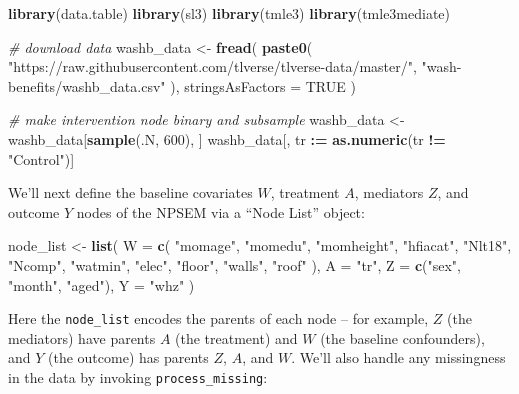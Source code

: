 \documentclass[12pt, krantz2,]{krantz}
\newenvironment{Shaded}{\begin{snugshade}}{\end{snugshade}}
\newcommand{\CommentTok}[1]{\textcolor[rgb]{0.37,0.37,0.37}{\textit{#1}}}
\newcommand{\DataTypeTok}[1]{\textcolor[rgb]{0.27,0.27,0.27}{#1}}
\newcommand{\DecValTok}[1]{\textcolor[rgb]{0.06,0.06,0.06}{#1}}
\newcommand{\ErrorTok}[1]{\textcolor[rgb]{0.14,0.14,0.14}{\textbf{#1}}}
\newcommand{\KeywordTok}[1]{\textcolor[rgb]{0.27,0.27,0.27}{\textbf{#1}}}
\newcommand{\NormalTok}[1]{#1}
\newcommand{\OperatorTok}[1]{\textcolor[rgb]{0.43,0.43,0.43}{\textbf{#1}}}
\newcommand{\OtherTok}[1]{\textcolor[rgb]{0.37,0.37,0.37}{#1}}
\newcommand{\StringTok}[1]{\textcolor[rgb]{0.5,0.5,0.5}{#1}}
\theoremstyle{definition}
\theoremstyle{definition}
\theoremstyle{definition}
\newcommand{\1}{\mathbbm{1}}
\begin{document}
\begin{Shaded}
\begin{Highlighting}[]
\KeywordTok{library}\NormalTok{(data.table)}
\KeywordTok{library}\NormalTok{(sl3)}
\KeywordTok{library}\NormalTok{(tmle3)}
\KeywordTok{library}\NormalTok{(tmle3mediate)}

\CommentTok{# download data}
\NormalTok{washb_data <-}\StringTok{ }\KeywordTok{fread}\NormalTok{(}
  \KeywordTok{paste0}\NormalTok{(}
    \StringTok{"https://raw.githubusercontent.com/tlverse/tlverse-data/master/"}\NormalTok{,}
    \StringTok{"wash-benefits/washb_data.csv"}
\NormalTok{  ),}
  \DataTypeTok{stringsAsFactors =} \OtherTok{TRUE}
\NormalTok{)}

\CommentTok{# make intervention node binary and subsample}
\NormalTok{washb_data <-}\StringTok{ }\NormalTok{washb_data[}\KeywordTok{sample}\NormalTok{(.N, }\DecValTok{600}\NormalTok{), ]}
\NormalTok{washb_data[, tr }\OperatorTok{:}\ErrorTok{=}\StringTok{ }\KeywordTok{as.numeric}\NormalTok{(tr }\OperatorTok{!=}\StringTok{ "Control"}\NormalTok{)]}
\end{Highlighting}
\end{Shaded}

We'll next define the baseline covariates \(W\), treatment \(A\), mediators \(Z\),
and outcome \(Y\) nodes of the NPSEM via a ``Node List'' object:

\begin{Shaded}
\begin{Highlighting}[]
\NormalTok{node_list <-}\StringTok{ }\KeywordTok{list}\NormalTok{(}
  \DataTypeTok{W =} \KeywordTok{c}\NormalTok{(}
    \StringTok{"momage"}\NormalTok{, }\StringTok{"momedu"}\NormalTok{, }\StringTok{"momheight"}\NormalTok{, }\StringTok{"hfiacat"}\NormalTok{, }\StringTok{"Nlt18"}\NormalTok{, }\StringTok{"Ncomp"}\NormalTok{, }\StringTok{"watmin"}\NormalTok{,}
    \StringTok{"elec"}\NormalTok{, }\StringTok{"floor"}\NormalTok{, }\StringTok{"walls"}\NormalTok{, }\StringTok{"roof"}
\NormalTok{  ),}
  \DataTypeTok{A =} \StringTok{"tr"}\NormalTok{,}
  \DataTypeTok{Z =} \KeywordTok{c}\NormalTok{(}\StringTok{"sex"}\NormalTok{, }\StringTok{"month"}\NormalTok{, }\StringTok{"aged"}\NormalTok{),}
  \DataTypeTok{Y =} \StringTok{"whz"}
\NormalTok{)}
\end{Highlighting}
\end{Shaded}

Here the \texttt{node\_list} encodes the parents of each node -- for example, \(Z\) (the
mediators) have parents \(A\) (the treatment) and \(W\) (the baseline confounders),
and \(Y\) (the outcome) has parents \(Z\), \(A\), and \(W\). We'll also handle any
missingness in the data by invoking \texttt{process\_missing}:
\end{document}
